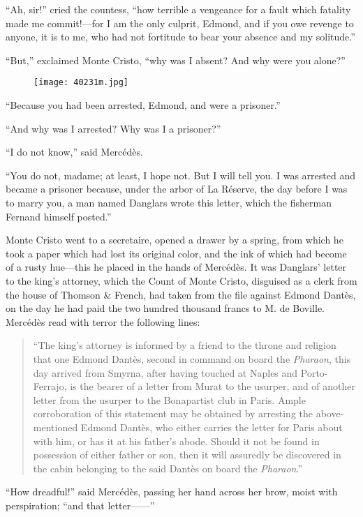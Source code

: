 “Ah, sir!” cried the countess, “how terrible a vengeance for a fault
which fatality made me commit!—for I am the only culprit, Edmond, and
if you owe revenge to anyone, it is to me, who had not fortitude to
bear your absence and my solitude.”

“But,” exclaimed Monte Cristo, “why was I absent? And why were you
alone?”

\begin{figure}[ht]
\texttt{[image: 40231m.jpg]}
\end{figure}

“Because you had been arrested, Edmond, and were a prisoner.”

“And why was I arrested? Why was I a prisoner?”

“I do not know,” said Mercédès.

“You do not, madame; at least, I hope not. But I will tell you. I was
arrested and became a prisoner because, under the arbor of La Réserve,
the day before I was to marry you, a man named Danglars wrote this
letter, which the fisherman Fernand himself posted.”

Monte Cristo went to a secretaire, opened a drawer by a spring, from
which he took a paper which had lost its original color, and the ink of
which had become of a rusty hue—this he placed in the hands of
Mercédès. It was Danglars’ letter to the king’s attorney, which the
Count of Monte Cristo, disguised as a clerk from the house of Thomson \&
French, had taken from the file against Edmond Dantès, on the day he
had paid the two hundred thousand francs to M. de Boville. Mercédès
read with terror the following lines:

\begin{quote}
{\small“The king’s attorney is informed by a friend to the throne and religion
that one Edmond Dantès, second in command on board the \textit{Pharaon}, this
day arrived from Smyrna, after having touched at Naples and
Porto-Ferrajo, is the bearer of a letter from Murat to the usurper, and
of another letter from the usurper to the Bonapartist club in Paris.
Ample corroboration of this statement may be obtained by arresting the
above-mentioned Edmond Dantès, who either carries the letter for Paris
about with him, or has it at his father’s abode. Should it not be found
in possession of either father or son, then it will assuredly be
discovered in the cabin belonging to the said Dantès on board the
\textit{Pharaon}.”}
\end{quote}

“How dreadful!” said Mercédès, passing her hand across her brow, moist
with perspiration; “and that letter——”

